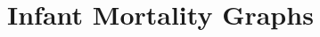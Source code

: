 \documentclass[12pt,letterpaper]{article}
\begin{document}
% 
% 
% 

\section{Infant Mortality Graphs}

\setcounter{figure}{0}
\setcounter{table}{0}
\end{document}
